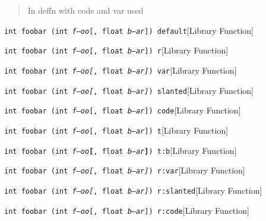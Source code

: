 \documentclass{book}
\newcommand\GNUTexinfocommandstyletextvar[1]{{\normalfont{}\textsl{#1}}}%
\begin{document}
%
\begin{quote}
\unskip{\parskip=0pt\noindent}%
In deffn with code and var used
\end{quote}

\noindent\texttt{int foobar (int \GNUTexinfocommandstyletextvar{f---oo}[, float \GNUTexinfocommandstyletextvar{b--ar}]) default}\hfill[Library Function]

%
\noindent\texttt{int foobar (int \GNUTexinfocommandstyletextvar{f---oo}\textnormal{[}, float \GNUTexinfocommandstyletextvar{b--ar}\textnormal{]}) r}\hfill[Library Function]

%
\noindent\texttt{int foobar (int \GNUTexinfocommandstyletextvar{f---oo}\GNUTexinfocommandstyletextvar{[}, float \GNUTexinfocommandstyletextvar{b--ar}\GNUTexinfocommandstyletextvar{]}) var}\hfill[Library Function]

%
\noindent\texttt{int foobar (int \GNUTexinfocommandstyletextvar{f---oo}\textsl{[}, float \GNUTexinfocommandstyletextvar{b--ar}\textsl{]}) slanted}\hfill[Library Function]

%
\noindent\texttt{int foobar (int \GNUTexinfocommandstyletextvar{f---oo}\texttt{[}, float \GNUTexinfocommandstyletextvar{b--ar}\texttt{]}) code}\hfill[Library Function]

%
\noindent\texttt{int foobar (int \GNUTexinfocommandstyletextvar{f---oo}\texttt{[}, float \GNUTexinfocommandstyletextvar{b--ar}\texttt{]}) t}\hfill[Library Function]

%
\noindent\texttt{int foobar (int \GNUTexinfocommandstyletextvar{f---oo}\texttt{\textbf{[}}, float \GNUTexinfocommandstyletextvar{b--ar}\texttt{\textbf{]}}) t:b}\hfill[Library Function]

%
\noindent\texttt{int foobar (int \GNUTexinfocommandstyletextvar{f---oo}\textnormal{\GNUTexinfocommandstyletextvar{[}}, float \GNUTexinfocommandstyletextvar{b--ar}\textnormal{\GNUTexinfocommandstyletextvar{]}}) r:var}\hfill[Library Function]

%
\noindent\texttt{int foobar (int \GNUTexinfocommandstyletextvar{f---oo}\textnormal{\textsl{[}}, float \GNUTexinfocommandstyletextvar{b--ar}\textnormal{\textsl{]}}) r:slanted}\hfill[Library Function]

%
\noindent\texttt{int foobar (int \GNUTexinfocommandstyletextvar{f---oo}\textnormal{\texttt{[}}, float \GNUTexinfocommandstyletextvar{b--ar}\textnormal{\texttt{]}}) r:code}\hfill[Library Function]
\end{document}
